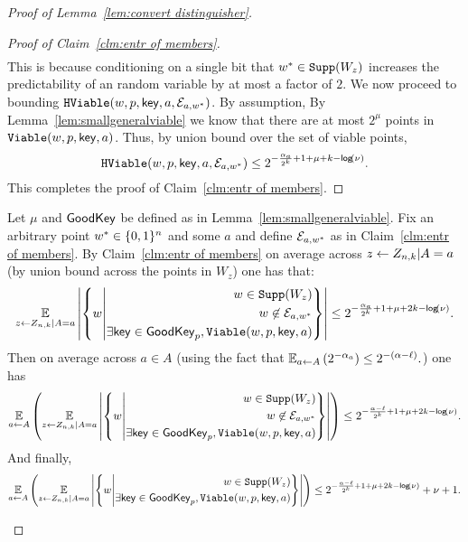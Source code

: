 \begin{proof}[Proof of Lemma~\ref{lem:convert distinguisher}]
\begin{proof}[Proof of Claim~\ref{clm:entr of members}]
\begin{align*}
\end{align*}
This is because conditioning on a single bit that $w^*\in \mathtt{Supp}(W_z)$ increases the predictability of an random variable by at most a factor of $2$. 
We now proceed to bounding $\mathtt{HViable}(w, p, \mathsf{key}, a, \mathcal{E}_{a,w^*})$.  By assumption, By Lemma~\ref{lem:smallgeneralviable} we know that there are at most $2^\mu$ points in $\mathtt{Viable}(w, p, \mathsf{key}, a)$.  Thus, by union bound over the set of viable points,
\[
\mathtt{HViable}(w, p, \mathsf{key}, a, \mathcal{E}_{a,w^*}) \le 2^{-\frac{\alpha_a}{2^k}+1+\mu+k-\mathsf{log}\!\left(\nu\right)}.
\]
\noindent
This completes the proof of Claim~\ref{clm:entr of members}.
\end{proof}


\begin{corollary}
\label{corollary:info loss}
Let $\mu$ and $\mathsf{GoodKey}$ be defined as in Lemma~\ref{lem:smallgeneralviable}.  Fix an arbitrary point $w^*\in \{0, 1\}^n$ and some $a$ and define $\mathcal{E}_{a,w^*}$ as in Claim~\ref{clm:entr of members}.  By Claim~\ref{clm:entr of members} on average across $z\leftarrow Z_{n,k}| A=a$ (by union bound across the points in $W_z$) one has that:
\begin{align*}
\operatorname*{\mathbb{E}}_{z\leftarrow Z_{n,k}| A=a} \left|\left\{ 
w\middle| \begin{aligned}w\in \mathtt{Supp}(W_z)\\w\not\in \mathcal{E}_{a,w^*} \\\exists \mathsf{key}\in\mathsf{GoodKey}_p, \mathtt{Viable}(w,p,\mathsf{key},a)\end{aligned} \right\} \right| \le 2^{-\frac{\alpha_a}{2^k}+1+\mu+2k-\mathsf{log}\!\left(\nu\right)}.
\end{align*}
Then on average across $a\in A$ (using the fact that $\operatorname*{\mathbb{E}}_{a\leftarrow A} \left(2^{-\alpha_a} \right) \le 2^{-(\alpha-\ell)}.$) one has 
\begin{align*}
\operatorname*{\mathbb{E}}_{a\leftarrow A}\left(\operatorname*{\mathbb{E}}_{z\leftarrow Z_{n,k}| A=a} \left|\left\{ 
w\middle| \begin{aligned}w\in \mathtt{Supp}(W_z)\\w\not\in \mathcal{E}_{a,w^*} \\\exists \mathsf{key}\in\mathsf{GoodKey}_p, \mathtt{Viable}(w,p,\mathsf{key},a)\end{aligned} \right\} \right| \right)\le 2^{-\frac{\alpha-\ell}{2^k}+1+\mu+2k-\mathsf{log}\!\left(\nu\right)}.
\end{align*}
And finally, 
\begin{align*}
\operatorname*{\mathbb{E}}_{a\leftarrow A}\left(\operatorname*{\mathbb{E}}_{z\leftarrow Z_{n,k}| A=a} \left|\left\{ 
w\middle| \begin{aligned}w\in \mathtt{Supp}(W_z)\\\exists \mathsf{key}\in\mathsf{GoodKey}_p, \mathtt{Viable}(w,p,\mathsf{key},a)\end{aligned} \right\} \right| \right)\le 2^{-\frac{\alpha-\ell}{2^k}+1+\mu+2k-\mathsf{log}\!\left(\nu\right)}+\nu+1.
\end{align*}
\end{corollary}


\end{proof}
